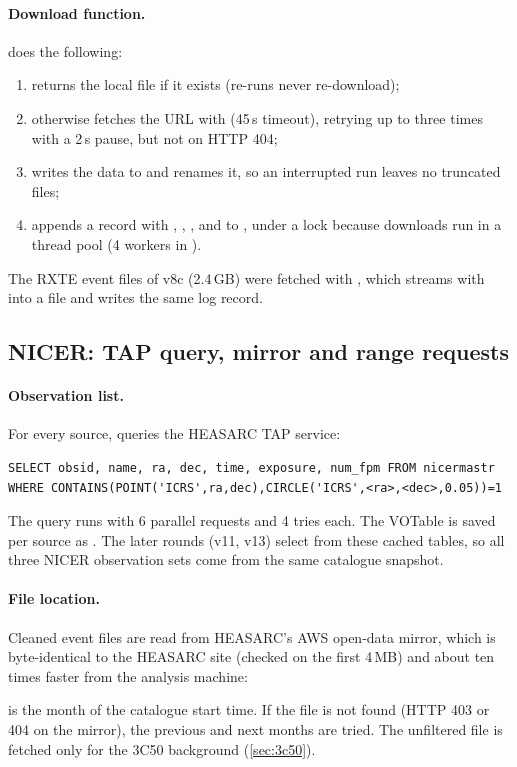 \paragraph{Download function.}  does the following:
\begin{enumerate}
\item returns the local file if it exists (re-runs never re-download);
\item otherwise fetches the URL with  (45\,s timeout), retrying up to three times with a 2\,s pause, but not
on HTTP 404;
\item writes the data to  and renames it, so an interrupted run leaves no truncated files;
\item appends a record with , , ,  and  to
, under a lock because downloads run in a thread pool (4 workers in
).
\end{enumerate}
The RXTE event files of v8c (2.4\,GB) were fetched with , which streams with  into a
 file and writes the same log record.

\subsection{NICER: TAP query, mirror and range requests}\label{sec:get-nicer}
\paragraph{Observation list.} For every source,  queries the HEASARC TAP service:
\begin{verbatim}
SELECT obsid, name, ra, dec, time, exposure, num_fpm FROM nicermastr
WHERE CONTAINS(POINT('ICRS',ra,dec),CIRCLE('ICRS',<ra>,<dec>,0.05))=1
\end{verbatim}
The query runs with 6 parallel requests and 4 tries each. The VOTable is saved per source as
. The later rounds (v11, v13) select from these cached tables, so
all three NICER observation sets come from the same catalogue snapshot.

\paragraph{File location.} Cleaned event files are read from HEASARC's AWS open-data mirror, which is byte-identical to
the HEASARC site (checked on the first 4\,MB) and about ten times faster from the analysis machine:
\begin{center}
\end{center}
 is the month of the catalogue start time. If the file is not found (HTTP 403 or 404 on the mirror), the
previous and next months are tried. The unfiltered file  is fetched only for the 3C50
background (\cref{sec:3c50}).

